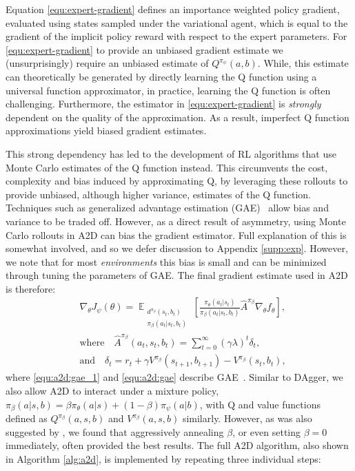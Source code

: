 Equation \eqref{equ:expert-gradient} defines an importance weighted policy gradient, evaluated using states sampled under the variational agent, which is equal to the gradient of the implicit policy reward with respect to the expert parameters.  For \eqref{equ:expert-gradient} to provide an unbiased gradient estimate we (unsurprisingly) require an unbiased estimate of $Q^{\pi_{\psi}}(a,b)$.  While, this estimate can theoretically be generated by directly learning the Q function using a universal function approximator, in practice, learning the Q function is often challenging.  Furthermore, the estimator in \eqref{equ:expert-gradient} is \emph{strongly} dependent on the quality of the approximation.  As a result, imperfect Q function approximations yield biased gradient estimates.

This strong dependency has led to the development of RL algorithms that use Monte Carlo estimates of the Q function instead.  This circumvents the cost, complexity and bias induced by approximating Q, by leveraging these rollouts to provide unbiased, although higher variance, estimates of the Q function.  Techniques such as generalized advantage estimation (GAE)~\citep{schulman2015high} allow bias and variance to be traded off. However, as a direct result of asymmetry, using Monte Carlo rollouts in A2D can bias the gradient estimator.  Full explanation of this is somewhat involved, and so we defer discussion to Appendix \ref{supp:exp}.  However, we note that for most \emph{environments} this bias is small and can be minimized through tuning the parameters of GAE.  The final gradient estimate used in A2D is therefore:
\begin{align}
    &\nabla_\theta J_{\psi}(\theta) = \mathop{\mathbb{E}}_{\substack{d^{\pi_{\beta}}(s_t, b_t) \\ \pi_{\beta}(a_t | s_t, b_t)}} \left[ \frac{\pi_{\theta}(a_t|s_t) }{\pi_{\beta}(a_t | s_t, b_t)} \hat{A}^{\pi_{\beta}} \nabla_\theta f_{\theta} \right] , \label{equ:a2d:a2d_update} \\
    & \mathrm{where} \quad \hat{A}^{\pi_{\beta}}(a_t,s_t,b_t) = \sum\nolimits_{t=0}^{\infty} (\gamma \lambda)^t \delta_t , \label{equ:a2d:gae_1}\\
    & \mathrm{and} \quad \delta_t = r_t + \gamma V^{\pi_{\beta}}(s_{t+1}, b_{t+1}) - V^{\pi_{\beta}}(s_t, b_t) , \label{equ:a2d:gae}
\end{align}
where \eqref{equ:a2d:gae_1} and \eqref{equ:a2d:gae} describe GAE~\citep{schulman2015high}.  Similar to DAgger, we also allow A2D to interact under a mixture policy, $\pi_{\beta}(a | s, b) = \beta \pi_{\theta}(a | s) + (1 - \beta) \pi_{\psi}(a | b)$, with Q and value functions defined as $Q^{\pi_\beta}(a, s, b)$ and $V^{\pi_\beta}(a, s, b)$ similarly.  However, as was also suggested by \cite{Ross2011}, we found that aggressively annealing $\beta$, or even setting $\beta = 0$ immediately, often provided the best results.  The full A2D algorithm, also shown in Algorithm \ref{alg:a2d}, is implemented by repeating three individual steps:

